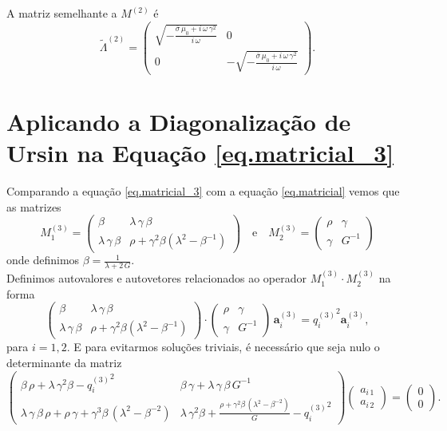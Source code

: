 A matriz semelhante a $M^{(2)}$ \'e
\begin{equation*}
\tilde{\Lambda}^{(2)}=
\begin{pmatrix}
\sqrt{-\frac{\overline{\sigma}\,\mu_0+i\,\omega\,\gamma^2}{i\,\omega}}&0\\
0&-\sqrt{-\frac{\overline{\sigma}\,\mu_0+i\,\omega\,\gamma^2}{i\,\omega}}
\end{pmatrix}.
\end{equation*}

\section{Aplicando a Diagonaliza\c{c}\~ao de Ursin na Equa\c{c}\~ao \ref{eq.matricial_3}}\label{sec.diagonalizacao_3}

Comparando a equa\c{c}\~ao \ref{eq.matricial_3} com a equa\c{c}\~ao \ref{eq.matricial} vemos que as matrizes
\begin{equation*}
M^{(3)}_1=
\begin{pmatrix}
\beta&\lambda\,\gamma\,\beta\\
\lambda\,\gamma\,\beta&\rho+\gamma^2\beta(\lambda^2-\beta^{-1})
\end{pmatrix}
\quad\text{e}\quad
M^{(3)}_2=
\begin{pmatrix}
\rho&\gamma\\
\gamma&G^{-1}
\end{pmatrix}
\end{equation*}
onde definimos $\beta=\frac{1}{\lambda+2\,G}$.\\
Definimos autovalores e autovetores relacionados ao operador $M^{(3)}_1\cdot M^{(3)}_2$ na forma
\begin{equation*}
\begin{pmatrix}
\beta&\lambda\,\gamma\,\beta\\
\lambda\,\gamma\,\beta&\rho+\gamma^2\beta(\lambda^2-\beta^{-1})
\end{pmatrix}
\cdot
\begin{pmatrix}
\rho&\gamma\\
\gamma&G^{-1}
\end{pmatrix}
\,\mathbf{a}^{(3)}_i
=
{q^{(3)}_i}^2\mathbf{a}^{(3)}_i,
\end{equation*}
para $i=1,2$.  E para evitarmos solu\c{c}\~oes triviais, \'e necess\'ario que seja nulo o determinante da matriz
\begin{equation}\label{eq.def_auto_3}
\begin{pmatrix}
\beta\,\rho+\lambda\,\gamma^2\beta-{q^{(3)}_i}^2&\beta\,\gamma+\lambda\,\gamma\,\beta\,G^{-1}\\
\lambda\,\gamma\,\beta\,\rho+\rho\,\gamma+\gamma^3\beta\,(\lambda^2-\beta^{-2})&\lambda\,\gamma^2\beta+\frac{\rho+\gamma^2\beta\,(\lambda^2-\beta^{-2})}{G}-{q^{(3)}_i}^2
\end{pmatrix}
\begin{pmatrix}
a_{i\,1}\\
a_{i\,2}
\end{pmatrix}
=
\begin{pmatrix}
0\\
0
\end{pmatrix}.
\end{equation}
